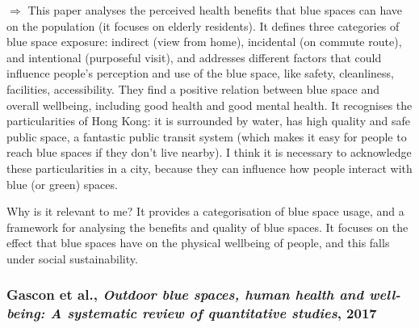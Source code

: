 \documentclass{article}
\begin{document}
\begin{outline}
	\1 $\Rightarrow$ This paper analyses the perceived health benefits that blue spaces can have on the population (it focuses on elderly residents). It defines three categories of blue space exposure: indirect (view from home), incidental (on commute route), and intentional (purposeful visit), and addresses different factors that could influence people's perception and use of the blue space, like safety, cleanliness, facilities, accessibility. They find a positive relation between blue space and overall wellbeing, including good health and good mental health.
	It recognises the particularities of Hong Kong: it is surrounded by water, has high quality and safe public space, a fantastic public transit system (which makes it easy for people to reach blue spaces if they don't live nearby). I think it is necessary to acknowledge these particularities in a city, because they can influence how people interact with blue (or green) spaces.
	
	Why is it relevant to me? It provides a categorisation of blue space usage, and a framework for analysing the benefits and quality of blue spaces. It focuses on the effect that blue spaces have on the physical wellbeing of people, and this falls under social sustainability. 
\end{outline}

\subsubsection{Gascon et al., \textit{Outdoor blue spaces, human health and well-being: A systematic review of quantitative studies}, 2017} \parencite{gascon2017outdoor}
\end{document}
